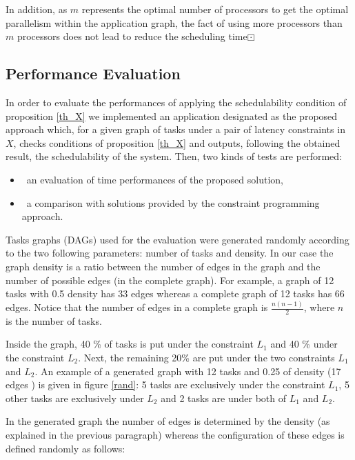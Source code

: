 \documentclass{ijcaArticle}
\begin{document}
In addition, as $m$ represents the optimal number of processors to get the optimal parallelism within the application graph, the fact of using more processors than $m$ processors
does not lead to reduce the scheduling time$\boxdot$
  
 
       
\subsection{Performance Evaluation}\label{first_tests}
 In order to evaluate the performances of applying the schedulability condition of proposition \ref{th_X} we implemented an application designated as the proposed approach which, for a given graph of tasks under a pair of latency constraints in $X$, checks conditions of proposition  \ref{th_X} and outputs, following the obtained result, the schedulability of the system.  Then, two kinds of tests are performed:
\begin{itemize}
\item \ an evaluation of time performances of the proposed solution, 
\item \ a comparison with solutions provided by the constraint programming approach.
\end{itemize} 

        
Tasks graphs (DAGs) used for the evaluation were generated randomly according to the two following parameters: number of tasks  and density. In our case the graph density is a ratio between the number of edges in the graph and the number of  possible edges (in the complete graph). For example, a graph of 12 tasks with 0.5 density has 33 edges whereas
a complete graph of 12 tasks has 66 edges. Notice that the number of edges in a complete graph is $\frac{n(n-1)}{2}$, where $n$ is the number of tasks.       

Inside the graph, 40 \% of tasks is put under the constraint $L_1$ and 40 \%  under the constraint
$L_2$. Next, the remaining 20\%  are put under the two constraints $L_1$ and $L_2$.  An example of a generated graph with 12 tasks and 0.25 of density (17 edges ) is given in figure \ref{rand}: 5 tasks are exclusively under the constraint $L_1$, 5 other tasks are exclusively under $L_2$  and 2 tasks are under both of $L_1$ and
$L_2$. 

In the generated graph the number of edges is determined by the density (as explained in the previous paragraph) whereas the configuration of these edges is defined randomly as follows:
\end{document}
